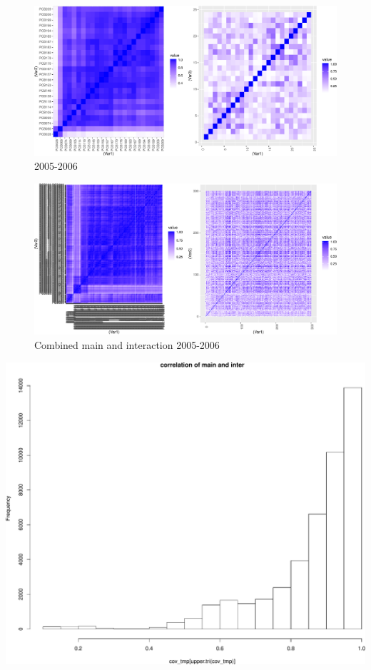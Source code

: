 \documentclass[]{article}
\begin{document}
\begin{figure}
\centering
\includegraphics{Low_levels_covariance_files/figure-latex/unnamed-chunk-7-1.pdf}
\caption{2005-2006}
\end{figure}

\begin{figure}
\centering
\includegraphics{Low_levels_covariance_files/figure-latex/unnamed-chunk-8-1.pdf}
\caption{Combined main and interaction 2005-2006}
\end{figure}

\includegraphics{Low_levels_covariance_files/figure-latex/unnamed-chunk-9-1.pdf}
\end{document}
